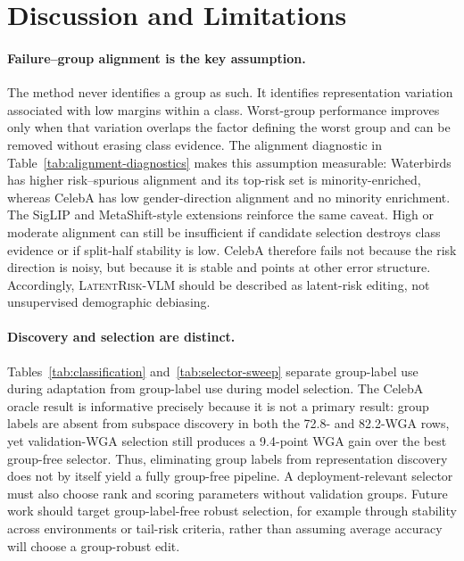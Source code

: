 \section{Discussion and Limitations}
\paragraph{Failure--group alignment is the key assumption.}
The method never identifies a group as such. It identifies representation variation associated with low margins within a class. Worst-group performance improves only when that variation overlaps the factor defining the worst group and can be removed without erasing class evidence. The alignment diagnostic in Table~\ref{tab:alignment-diagnostics} makes this assumption measurable: Waterbirds has higher risk--spurious alignment and its top-risk set is minority-enriched, whereas CelebA has low gender-direction alignment and no minority enrichment. The SigLIP and MetaShift-style extensions reinforce the same caveat. High or moderate alignment can still be insufficient if candidate selection destroys class evidence or if split-half stability is low. CelebA therefore fails not because the risk direction is noisy, but because it is stable and points at other error structure. Accordingly, \textsc{LatentRisk-VLM} should be described as latent-risk editing, not unsupervised demographic debiasing.

\paragraph{Discovery and selection are distinct.}
Tables~\ref{tab:classification} and~\ref{tab:selector-sweep} separate group-label use during adaptation from group-label use during model selection. The CelebA oracle result is informative precisely because it is not a primary result: group labels are absent from subspace discovery in both the 72.8- and 82.2-WGA rows, yet validation-WGA selection still produces a 9.4-point WGA gain over the best group-free selector. Thus, eliminating group labels from representation discovery does not by itself yield a fully group-free pipeline. A deployment-relevant selector must also choose rank and scoring parameters without validation groups. Future work should target group-label-free robust selection, for example through stability across environments or tail-risk criteria, rather than assuming average accuracy will choose a group-robust edit.

